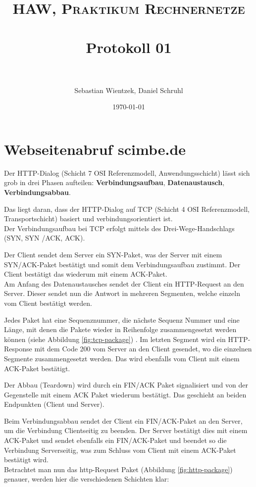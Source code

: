 \documentclass[paper=a4, fontsize=11pt]{scrreprt}
\title{	
	\normalfont \normalsize 
	\textsc{HAW, Praktikum Rechnernetze} \\ [25pt] 
	\horrule{0.5pt} \\[0.4cm]
	\huge Protokoll 01 \\
	\horrule{2pt} \\[0.5cm]
}
\author{Sebastian Wientzek, Daniel Schruhl}
\date{\normalsize\today}
\numberwithin{equation}{section}
\numberwithin{figure}{section}
\numberwithin{table}{section}
\begin{document}
\maketitle

\section{Webseitenabruf scimbe.de}

Der HTTP-Dialog (Schicht 7 OSI Referenzmodell, Anwendungsschicht) lässt sich grob in drei Phasen aufteilen: \textbf{Verbindungsaufbau}, \textbf{Datenaustausch}, \textbf{Verbindungsabbau}.

Das liegt daran, dass der HTTP-Dialog auf TCP (Schicht 4 OSI Referenzmodell, Transportschicht) basiert und verbindungsorientiert ist.\\

Der Verbindungsaufbau bei TCP erfolgt mittels des Drei-Wege-Handschlags (SYN, SYN /ACK, ACK).

Der Client sendet dem Server ein SYN-Paket, was der Server mit einem SYN/ACK-Paket bestätigt und somit dem Verbindungsaufbau zustimmt. Der Client bestätigt das wiederum mit einem ACK-Paket.\\

Am Anfang des Datenaustausches sendet der Client ein HTTP-Request an den Server. Dieser sendet nun die Antwort in mehreren Segmenten, welche einzeln vom Client bestätigt werden. 

Jedes Paket hat eine Sequenznummer, die nächste Sequenz Nummer und eine Länge, mit denen die Pakete wieder in Reihenfolge zusammengesetzt werden können (siehe Abbildung \ref{fig:tcp-package}) . Im letzten Segment wird ein HTTP-Response mit dem Code 200 vom Server an den Client gesendet, wo die einzelnen Segmente zusammengesetzt werden. Das wird ebenfalls vom Client mit einem ACK-Paket bestätigt.

Der Abbau (Teardown) wird durch ein FIN/ACK Paket signalisiert und von der Gegenstelle mit einem ACK Paket wiederum bestätigt. Das geschieht an beiden Endpunkten (Client und Server).

Beim Verbindungsabbau sendet der Client ein FIN/ACK-Paket an den Server, um die Verbindung Clientseitig zu beenden. Der Server bestätigt dies mit einem ACK-Paket und sendet ebenfalls ein FIN/ACK-Paket und beendet so die Verbindung Serverseitig, was zum Schluss vom Client mit einem ACK-Paket bestätigt wird.\\

Betrachtet man nun das http-Request Paket (Abbildung \ref{fig:http-package}) genauer, werden hier die verschiedenen Schichten klar:
\end{document}
